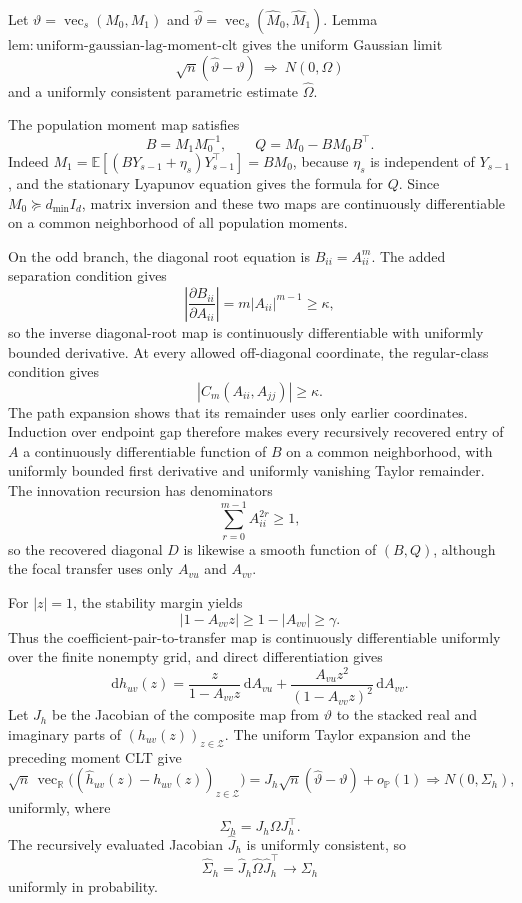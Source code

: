 Let \(\vartheta=\operatorname{vec}_{s}(M_0,M_1)\) and \(\widehat\vartheta=\operatorname{vec}_{s}(\widehat M_0,\widehat M_1)\).  Lemma \(\mathrm{lem{:}uniform\mbox{-}gaussian\mbox{-}lag\mbox{-}moment\mbox{-}clt}\) gives the uniform Gaussian limit
\[
 \sqrt n(\widehat\vartheta-\vartheta)\ \Longrightarrow\ N(0,\Omega)
\]
and a uniformly consistent parametric estimate \(\widehat\Omega\).

The population moment map satisfies
\[
 B=M_1M_0^{-1},\qquad Q=M_0-BM_0B^\top.
\]
Indeed \(M_1=\mathbb E[(BY_{s-1}+\eta_s)Y_{s-1}^\top]=BM_0\), because \(\eta_s\) is independent of \(Y_{s-1}\), and the stationary Lyapunov equation gives the formula for \(Q\).  Since \(M_0\succeq d_{\min}I_d\), matrix inversion and these two maps are continuously differentiable on a common neighborhood of all population moments.

On the odd branch, the diagonal root equation is \(B_{ii}=A_{ii}^m\).  The added separation condition gives
\[
 \left|\frac{\partial B_{ii}}{\partial A_{ii}}\right|
 =m|A_{ii}|^{m-1}\ge\kappa,
\]
so the inverse diagonal-root map is continuously differentiable with uniformly bounded derivative.  At every allowed off-diagonal coordinate, the regular-class condition gives
\[
 |C_m(A_{ii},A_{jj})|\ge\kappa.
\]
The path expansion shows that its remainder uses only earlier coordinates.  Induction over endpoint gap therefore makes every recursively recovered entry of \(A\) a continuously differentiable function of \(B\) on a common neighborhood, with uniformly bounded first derivative and uniformly vanishing Taylor remainder.  The innovation recursion has denominators
\[
 \sum_{r=0}^{m-1}A_{ii}^{2r}\ge1,
\]
so the recovered diagonal \(D\) is likewise a smooth function of \((B,Q)\), although the focal transfer uses only \(A_{vu}\) and \(A_{vv}\).

For \(|z|=1\), the stability margin yields
\[
 |1-A_{vv}z|\ge1-|A_{vv}|\ge\gamma.
\]
Thus the coefficient-pair-to-transfer map is continuously differentiable uniformly over the finite nonempty grid, and direct differentiation gives
\[
 \mathrm dh_{uv}(z)
 =\frac{z}{1-A_{vv}z}\,\mathrm dA_{vu}
 +\frac{A_{vu}z^2}{(1-A_{vv}z)^2}\,\mathrm dA_{vv}.
\]
Let \(J_h\) be the Jacobian of the composite map from \(\vartheta\) to the stacked real and imaginary parts of \((h_{uv}(z))_{z\in\mathcal Z}\).  The uniform Taylor expansion and the preceding moment CLT give
\[
 \sqrt n\,\operatorname{vec}_{\mathbb R}
 \big((\widehat h_{uv}(z)-h_{uv}(z))_{z\in\mathcal Z}\big)
 =J_h\sqrt n(\widehat\vartheta-\vartheta)+o_{\mathbb P}(1)
 \Longrightarrow N(0,\Sigma_h),
\]
uniformly, where
\[
 \Sigma_h=J_h\Omega J_h^\top.
\]
The recursively evaluated Jacobian \(\widehat J_h\) is uniformly consistent, so
\[
 \widehat\Sigma_h=\widehat J_h\widehat\Omega\widehat J_h^\top
 \longrightarrow\Sigma_h
\]
uniformly in probability.

